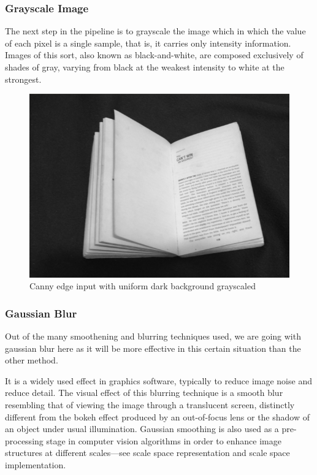 \documentclass[BTech]{srmuthesis}
\begin{document}
\subsubsection{Grayscale Image}

The next step in the pipeline is to grayscale the image which in which the value of each pixel is a single sample, that is, it carries only intensity information. Images of this sort, also known as black-and-white, are composed exclusively of shades of gray, varying from black at the weakest intensity to white at the strongest.

\begin{figure}[h!]
    \centering
    \includegraphics[width=15cm\textwidth]{win_frnds_blue_gray_640x480}
    \caption{Canny edge input with uniform dark background grayscaled}
    \label{fig:Canny edge input with uniform background grayscaled}
\end{figure}

\newpage

\subsubsection{Gaussian Blur}

Out of the many smoothening and blurring techniques used, we are going with gaussian blur here as it will be more effective in this certain situation than the other method.

It is a widely used effect in graphics software, typically to reduce image noise and reduce detail. The visual effect of this blurring technique is a smooth blur resembling that of viewing the image through a translucent screen, distinctly different from the bokeh effect produced by an out-of-focus lens or the shadow of an object under usual illumination. Gaussian smoothing is also used as a pre-processing stage in computer vision algorithms in order to enhance image structures at different scales—see scale space representation and scale space implementation.
\end{document}
